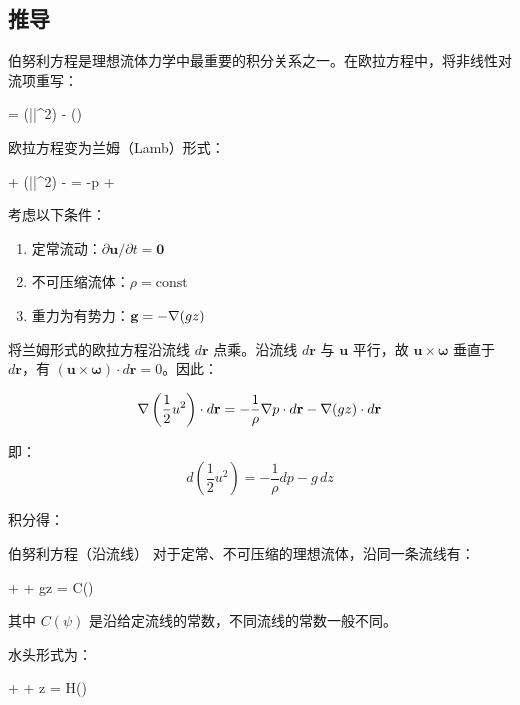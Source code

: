 \subsection{推导}

伯努利方程是理想流体力学中最重要的积分关系之一。在欧拉方程中，将非线性对流项重写：
\begin{myformula}
\cdot\Nabla{} = \Nabla\left(||^2\right) - \times(\Nabla\times{})
\end{myformula}

欧拉方程变为兰姆（Lamb）形式：
\begin{myformula}
 + \Nabla\left(||^2\right) - \times\boldsymbol{\omega} = -\Nabla p + 
\end{myformula}

考虑以下条件：
\begin{enumerate}
    \item 定常流动：\(\partial\mathbf{u}/\partial t = \mathbf{0}\)
    \item 不可压缩流体：\(\rho = \text{const}\)
    \item 重力为有势力：\(\mathbf{g} = -\nabla(gz)\)
\end{enumerate}

将兰姆形式的欧拉方程沿流线 \(d\mathbf{r}\) 点乘。沿流线 \(d\mathbf{r}\) 与 \(\mathbf{u}\) 平行，故 \(\mathbf{u}\times\boldsymbol{\omega}\) 垂直于 \(d\mathbf{r}\)，有 \((\mathbf{u}\times\boldsymbol{\omega})\cdot d\mathbf{r} = 0\)。因此：

\[
\nabla\left(\frac{1}{2}u^2\right)\cdot d\mathbf{r} = -\frac{1}{\rho}\nabla p \cdot d\mathbf{r} - \nabla(gz)\cdot d\mathbf{r}
\]

即：
\[
d\left(\frac{1}{2}u^2\right) = -\frac{1}{\rho} dp - g\,dz
\]

积分得：

\begin{myTheorem}{伯努利方程（沿流线）}
对于定常、不可压缩的理想流体，沿同一条流线有：
\begin{myformula}
 +  + gz = C(\psi)
\end{myformula}
其中 \(C(\psi)\) 是沿给定流线的常数，不同流线的常数一般不同。
\end{myTheorem}

水头形式为：
\begin{myformula}
 +  + z = H(\psi)
\end{myformula}

